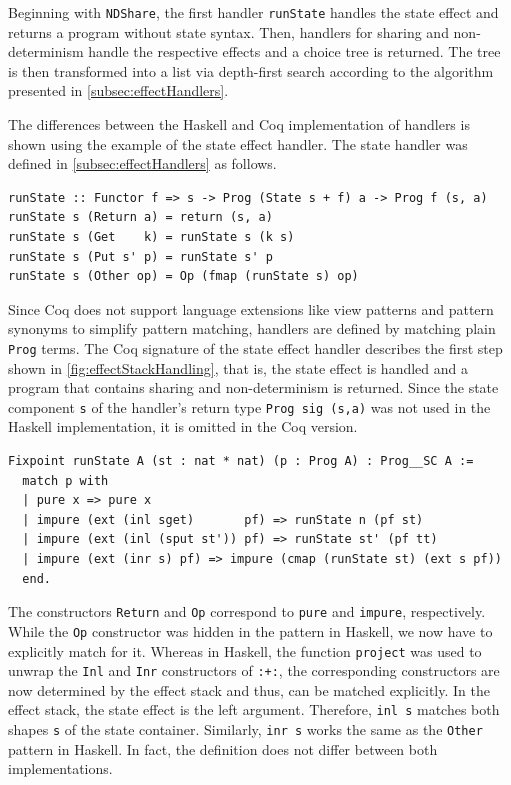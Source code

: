 \documentclass[a4paper, 11pt, fleqn, twoside, abstract=on]{scrreprt}
\newcommand{\hinl}[1]{\texttt{#1}}
\newcommand{\cinl}[1]{\texttt{#1}}
\begin{document}
Beginning with \cinl{NDShare}, the first handler \cinl{runState} handles the state effect and returns a program without state syntax.
Then, handlers for sharing and non-determinism handle the respective effects and a choice tree is returned.
The tree is then transformed into a list via depth-first search according to the algorithm presented in \autoref{subsec:effectHandlers}.

The differences between the Haskell and Coq implementation of handlers is shown using the example of the state effect handler.
The state handler was defined in \autoref{subsec:effectHandlers} as follows.

\begin{verbatim}
runState :: Functor f => s -> Prog (State s + f) a -> Prog f (s, a)
runState s (Return a) = return (s, a)
runState s (Get    k) = runState s (k s)
runState s (Put s' p) = runState s' p
runState s (Other op) = Op (fmap (runState s) op)
\end{verbatim}

Since Coq does not support language extensions like view patterns and pattern synonyms to simplify pattern matching, handlers are defined by matching plain \cinl{Prog} terms.
The Coq signature of the state effect handler describes the first step shown in \autoref{fig:effectStackHandling}, that is, the state effect is handled and a program that contains sharing and non-determinism is returned.
Since the state component \hinl{s} of the handler's return type \hinl{Prog sig (s,a)} was not used in the Haskell implementation, it is omitted in the Coq version.

\begin{verbatim}
Fixpoint runState A (st : nat * nat) (p : Prog A) : Prog__SC A :=
  match p with
  | pure x => pure x
  | impure (ext (inl sget)       pf) => runState n (pf st)
  | impure (ext (inl (sput st')) pf) => runState st' (pf tt)
  | impure (ext (inr s) pf) => impure (cmap (runState st) (ext s pf))
  end.
\end{verbatim}

The constructors \hinl{Return} and \hinl{Op} correspond to \cinl{pure} and \cinl{impure}, respectively.
While the \hinl{Op} constructor was hidden in the pattern in Haskell, we now have to explicitly match for it.
Whereas in Haskell, the function \hinl{project} was used to unwrap the \hinl{Inl} and \hinl{Inr} constructors of \hinl{:+:}, the corresponding constructors are now determined by the effect stack and thus, can be matched explicitly.
In the effect stack, the state effect is the left argument.
Therefore, \cinl{inl s} matches both shapes \cinl{s} of the state container.
Similarly, \cinl{inr s} works the same as the \hinl{Other} pattern in Haskell.
In fact, the definition does not differ between both implementations.
\end{document}
